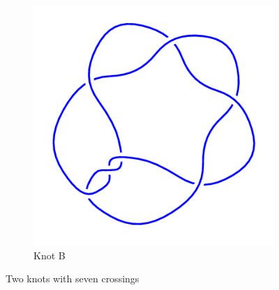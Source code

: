 \documentclass[12pt,letterpaper]{article}
\begin{document}
\begin{figure}[h]
\begin{subfigure}{.45\textwidth}
        \includegraphics[width=\textwidth]{homework04pics/7_3mirror.png}
        \caption{Knot B}
    \end{subfigure}
    \caption{Two knots with seven crossings}
\end{figure}
\end{document}
